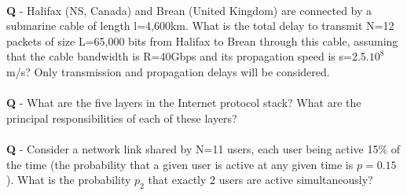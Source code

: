 \documentclass{llncs}
\newcounter{ques}
\renewcommand{\question}[1]{\paragraph{}\textbf{Q\theques} - #1\stepcounter{ques} }
\newcommand{\answer}[1]{}%
\begin{document}
\newpage

\question{Halifax (NS, Canada) and Brean (United Kingdom) are
  connected by a submarine cable of length l=4,600km. What is the
  total delay to transmit N=12 packets of size L=65,000 bits from
  Halifax to Brean through this cable, assuming that the cable bandwidth is
  R=40Gbps and its propagation speed is s=2.5.$10^8$m/s? Only
  transmission and propagation delays will be considered.}

\answer{ According to slide 45 to 47 in Chapter 1, the delay $d$ to
  transmit N packets will be the delay to transmit the last packet, i.e.:
  \begin{equation*}
    d=Nd_{trans} + d_{prop} \\
  \end{equation*}
  Where $d_{trans}$ and $d_{prop}$ are the transmission and
  propagation delays of a single packet, respectively:
  \begin{equation*}
    d_{trans} = \frac{L}{R} \quad \mathrm{and} \quad d_{prop} = \frac{l}{s}
  \end{equation*}
  It gives:
  \begin{equation*}
    d = 12\frac{65,000}{40.10^9}+\frac{4,600.10^3}{2.5.10^8}
  \end{equation*}
  \begin{equation*}
    d = 0.0184s \quad (d= 18.4ms)
  \end{equation*}
}

\newpage



\question{What are the five layers in the Internet protocol stack?
  What are the principal responsibilities of each of these layers?}
\answer{See slide 60 in Chapter 1.}

\newpage

\question{Consider a network link shared by N=11 users, each user
  being active 15\% of the time (the probability that a given user is
  active at any given time is $p=0.15$). What is the probability $p_2$ that exactly $2$
  users are active simultaneously?}
\end{document}
